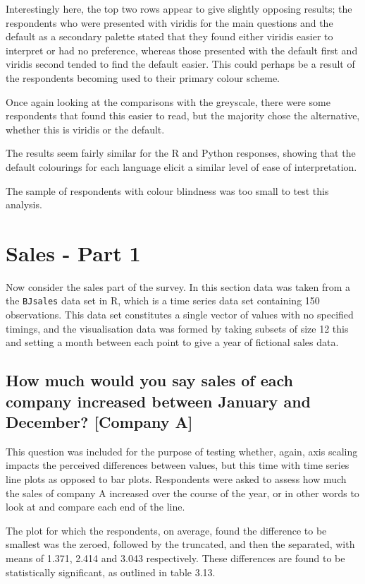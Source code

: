 \documentclass[
  11pt,
]{book}
\begin{document}
Interestingly here, the top two rows appear to give slightly opposing
results; the respondents who were presented with viridis for the main
questions and the default as a secondary palette stated that they found
either viridis easier to interpret or had no preference, whereas those
presented with the default first and viridis second tended to find the
default easier. This could perhaps be a result of the respondents
becoming used to their primary colour scheme.

Once again looking at the comparisons with the greyscale, there were
some respondents that found this easier to read, but the majority chose
the alternative, whether this is viridis or the default.

The results seem fairly similar for the R and Python responses, showing
that the default colourings for each language elicit a similar level of
ease of interpretation.

The sample of respondents with colour blindness was too small to test
this analysis.

\section{Sales - Part 1}

Now consider the sales part of the survey. In this section data was
taken from a the \texttt{BJsales} data set in R, which is a time series
data set containing 150 observations. This data set constitutes a single
vector of values with no specified timings, and the visualisation data
was formed by taking subsets of size 12 this and setting a month between
each point to give a year of fictional sales data.

\subsection{How much would you say sales of each company increased between January and December? [Company A]}

This question was included for the purpose of testing whether, again,
axis scaling impacts the perceived differences between values, but this
time with time series line plots as opposed to bar plots. Respondents
were asked to assess how much the sales of company A increased over the
course of the year, or in other words to look at and compare each end of
the line.

The plot for which the respondents, on average, found the difference to
be smallest was the zeroed, followed by the truncated, and then the
separated, with means of 1.371, 2.414 and 3.043 respectively. These
differences are found to be statistically significant, as outlined in
table 3.13.
\end{document}
